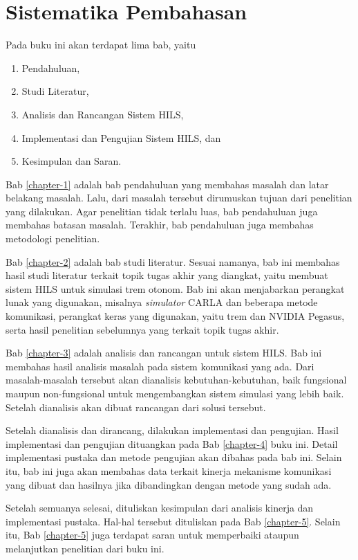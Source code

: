 \section{Sistematika Pembahasan}


Pada buku ini akan terdapat lima bab, yaitu
\begin{enumerate}
	\item Pendahuluan,
	\item Studi Literatur,
	\item Analisis dan Rancangan Sistem HILS,
	\item Implementasi dan Pengujian Sistem HILS, dan
	\item Kesimpulan dan Saran.
\end{enumerate}

Bab \ref{chapter-1} adalah bab pendahuluan yang membahas masalah dan latar belakang
masalah. Lalu, dari masalah tersebut dirumuskan tujuan dari penelitian yang
dilakukan. Agar penelitian tidak terlalu luas, bab pendahuluan juga membahas
batasan masalah. Terakhir, bab pendahuluan juga membahas metodologi penelitian.

Bab \ref{chapter-2} adalah bab studi literatur. Sesuai namanya, bab ini membahas
hasil studi literatur terkait topik tugas akhir yang diangkat, yaitu membuat
sistem HILS untuk simulasi trem otonom. Bab ini akan menjabarkan perangkat lunak
yang digunakan, misalnya \textit{simulator} CARLA dan beberapa metode
komunikasi, perangkat keras yang digunakan, yaitu trem dan NVIDIA Pegasus, serta
hasil penelitian sebelumnya yang terkait topik tugas akhir.

Bab \ref{chapter-3} adalah analisis dan rancangan untuk sistem HILS. Bab ini
membahas hasil analisis masalah pada sistem komunikasi yang ada. Dari
masalah-masalah tersebut akan dianalisis kebutuhan-kebutuhan, baik fungsional
maupun non-fungsional untuk mengembangkan sistem simulasi yang lebih baik.
Setelah dianalisis akan dibuat rancangan dari solusi tersebut.

Setelah dianalisis dan dirancang, dilakukan implementasi dan pengujian. Hasil
implementasi dan pengujian dituangkan pada Bab \ref{chapter-4} buku ini. Detail
implementasi pustaka dan metode pengujian akan dibahas pada bab ini. Selain itu,
bab ini juga akan membahas data terkait kinerja mekanisme komunikasi
yang dibuat dan hasilnya jika dibandingkan dengan metode yang sudah ada.

Setelah semuanya selesai, dituliskan kesimpulan dari analisis kinerja dan
implementasi pustaka. Hal-hal tersebut dituliskan pada Bab \ref{chapter-5}.
Selain itu, Bab \ref{chapter-5} juga terdapat saran untuk memperbaiki ataupun
melanjutkan penelitian dari buku ini.
